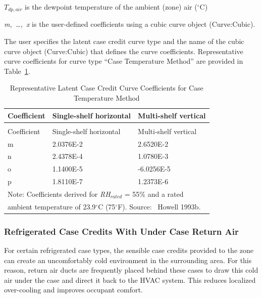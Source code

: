 \({T_{dp,air}}\) is the dewpoint temperature of the ambient (zone) air (\(^{\circ}\)C)

\emph{m,~\ldots{},~x} is the user-defined coefficients using a cubic curve object (Curve:Cubic).

The user specifies the latent case credit curve type and the name of the cubic curve object (Curve:Cubic) that defines the curve coefficients. Representative curve coefficients for curve type ``Case Temperature Method'' are provided in Table~\ref{table:representative-latent-case-credit-curve}.

\begin{longtable}[c]{p{1.5in}p{2.36in}p{2.13in}}
\caption{Representative Latent Case Credit Curve Coefficients for Case Temperature Method \label{table:representative-latent-case-credit-curve}} \tabularnewline
\toprule 
Coefficient & Single-shelf horizontal & Multi-shelf vertical \tabularnewline
\midrule
\endfirsthead

\caption{Representative Latent Case Credit Curve Coefficients for Case Temperature Method} \tabularnewline
\toprule 
Coefficient & Single-shelf horizontal & Multi-shelf vertical \tabularnewline
\midrule
\endhead

m & 2.0376E-2 & 2.6520E-2 \tabularnewline
n & 2.4378E-4 & 1.0780E-3 \tabularnewline
o & 1.1400E-5 & -6.0256E-5 \tabularnewline
p & 1.8110E-7 & 1.2373E-6 \tabularnewline
\midrule
\multicolumn{3}{l}{Note: Coefficients derived for \emph{RH\(_{rated}\)} = 55\% and a rated} \tabularnewline
\multicolumn{3}{l}{ambient temperature of 23.9\(^{\circ}\)C (75\(^{\circ}\)F). Source:~ Howell 1993b.} \tabularnewline
\bottomrule
\end{longtable}

\subsubsection{Refrigerated Case Credits With Under Case Return Air}\label{refrigerated-case-credits-with-under-case-return-air}

For certain refrigerated case types, the sensible case credits provided to the zone can create an uncomfortably cold environment in the surrounding area. For this reason, return air ducts are frequently placed behind these cases to draw this cold air under the case and direct it back to the HVAC system. This reduces localized over-cooling and improves occupant comfort.

